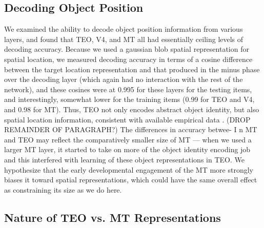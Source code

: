\documentclass[11pt,twoside]{article}
\newif\myifpdf
\begin{document}
\subsection{Decoding Object Position}
We examined the ability to decode object position information from various layers, and found that TEO, V4, and MT all had essentially ceiling levels of decoding accuracy.  Because we used a gaussian blob spatial representation for spatial location, we measured decoding accuracy in terms of a cosine difference between the target location representation and that produced in the minus phase over the decoding layer (which again had no interaction with the rest of the network), and these cosines were at 0.995 for these layers for the testing items, and interestingly, somewhat lower for the training items (0.99 for TEO and V4, and 0.98 for MT).  Thus, TEO not only encodes abstract object identity, but also spatial location information, consistent with available empirical data \cite{MajajHongSolomonEtAl15}.  (DROP REMAINDER OF PARAGRAPH?) The differences in accuracy betwee- I n MT and TEO may reflect the comparatively smaller size of MT --- when we used a larger MT layer, it started to take on more of the object identity encoding job and this interfered with learning of these object representations in TEO.  We hypothesize that the early developmental engagement of the MT more strongly biases it toward spatial representations, which could have the same overall effect as constraining its size as we do here.

\subsection{Nature of TEO vs. MT Representations}
\end{document}
